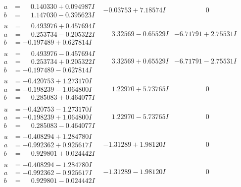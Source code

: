 \documentclass[1p]{elsarticle_modified}
\theoremstyle{definition}
\begin{document}
$$\begin{array}{c|c|c}
\begin{aligned}
a &= \phantom{-}0.140330 + 0.094987 I \\
b &= \phantom{-}1.147030 - 0.395623 I\end{aligned}
 & -0.03753 + 7.18574 I & \phantom{-0.000000 } 0 \\ \hline\begin{aligned}
u &= \phantom{-}0.493976 + 0.457694 I \\
a &= \phantom{-}0.253734 - 0.205322 I \\
b &= -0.197489 + 0.627814 I\end{aligned}
 & \phantom{-}3.32569 - 0.65529 I & -6.71791 + 2.75531 I \\ \hline\begin{aligned}
u &= \phantom{-}0.493976 - 0.457694 I \\
a &= \phantom{-}0.253734 + 0.205322 I \\
b &= -0.197489 - 0.627814 I\end{aligned}
 & \phantom{-}3.32569 + 0.65529 I & -6.71791 - 2.75531 I \\ \hline\begin{aligned}
u &= -0.420753 + 1.273170 I \\
a &= -0.198239 - 1.064800 I \\
b &= \phantom{-}0.285083 + 0.464077 I\end{aligned}
 & \phantom{-}1.22970 + 5.73765 I & \phantom{-0.000000 } 0 \\ \hline\begin{aligned}
u &= -0.420753 - 1.273170 I \\
a &= -0.198239 + 1.064800 I \\
b &= \phantom{-}0.285083 - 0.464077 I\end{aligned}
 & \phantom{-}1.22970 - 5.73765 I & \phantom{-0.000000 } 0 \\ \hline\begin{aligned}
u &= -0.408294 + 1.284780 I \\
a &= -0.992362 + 0.925617 I \\
b &= \phantom{-}0.929801 + 0.024442 I\end{aligned}
 & -1.31289 + 1.98120 I & \phantom{-0.000000 } 0 \\ \hline\begin{aligned}
u &= -0.408294 - 1.284780 I \\
a &= -0.992362 - 0.925617 I \\
b &= \phantom{-}0.929801 - 0.024442 I\end{aligned}
 & -1.31289 - 1.98120 I & \phantom{-0.000000 } 0\\

\end{array}$$
\end{document}
